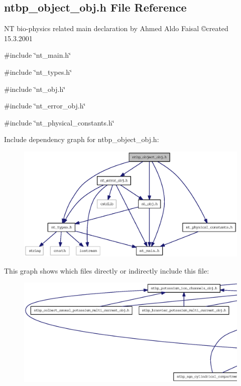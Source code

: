\subsection{ntbp\_\-object\_\-obj.h File Reference}
\label{ntbp__object__obj_8h}



\begin{DoxyItemize}
\item NT bio-\/physics related main declaration by Ahmed Aldo Faisal \copyright created 15.3.2001 
\end{DoxyItemize} 


{\ttfamily \#include \char`\"{}nt\_\-main.h\char`\"{}}\par
{\ttfamily \#include \char`\"{}nt\_\-types.h\char`\"{}}\par
{\ttfamily \#include \char`\"{}nt\_\-obj.h\char`\"{}}\par
{\ttfamily \#include \char`\"{}nt\_\-error\_\-obj.h\char`\"{}}\par
{\ttfamily \#include \char`\"{}nt\_\-physical\_\-constants.h\char`\"{}}\par
Include dependency graph for ntbp\_\-object\_\-obj.h:
\nopagebreak
\begin{figure}[H]
\begin{center}
\leavevmode
\includegraphics[width=400pt]{ntbp__object__obj_8h__incl}
\end{center}
\end{figure}
This graph shows which files directly or indirectly include this file:
\nopagebreak
\begin{figure}[H]
\begin{center}
\leavevmode
\includegraphics[width=400pt]{ntbp__object__obj_8h__dep__incl}
\end{center}
\end{figure}
